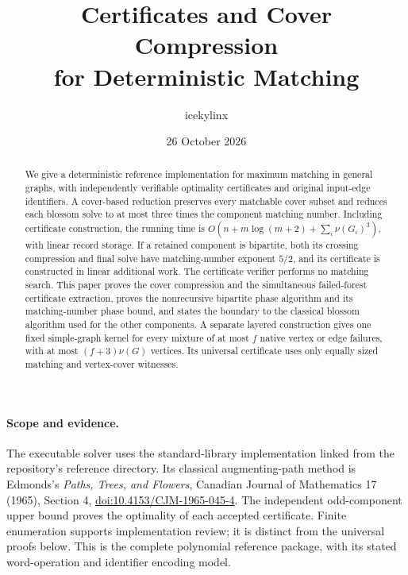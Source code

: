 
\providecommand{\tightlist}{\setlength{\itemsep}{0pt}\setlength{\parskip}{0pt}}
\title{Certificates and Cover Compression\\for Deterministic Matching}
\author{icekylinx}
\date{26 October 2026}

\maketitle
\begin{abstract}
We give a deterministic reference implementation for maximum matching in
general graphs, with independently verifiable optimality certificates and
original input-edge identifiers. A cover-based reduction preserves every
matchable cover subset and reduces each blossom solve to at most three times
the component matching number. Including certificate construction, the
running time is \(O(n+m\log(m+2)+\sum_i\nu(G_i)^3)\), with linear
record storage. If a retained component is bipartite, both its crossing
compression and final solve have matching-number exponent \(5/2\), and
its certificate is constructed in linear additional work.
The certificate verifier performs no matching search. This paper proves the
cover compression and the simultaneous failed-forest certificate extraction,
proves the nonrecursive bipartite phase algorithm and its matching-number
phase bound, and states the boundary to the classical blossom algorithm
used for the other components. A separate layered construction gives one
fixed simple-graph kernel for every mixture of at most \(f\) native vertex
or edge failures, with at most \((f+3)\nu(G)\) vertices. Its universal
certificate uses only equally sized matching and vertex-cover witnesses.
\end{abstract}

\paragraph{Scope and evidence.}
The executable solver uses the standard-library implementation linked from
the repository's reference directory. Its classical augmenting-path method
is Edmonds's \emph{Paths, Trees, and Flowers}, Canadian Journal of Mathematics
17 (1965), Section 4,
\href{https://doi.org/10.4153/CJM-1965-045-4}{doi:10.4153/CJM-1965-045-4}.
The independent odd-component upper bound proves the optimality of each
accepted certificate. Finite enumeration supports implementation review;
it is distinct from the universal proofs below. This is the complete
polynomial reference package, with its stated word-operation and identifier
encoding model.

